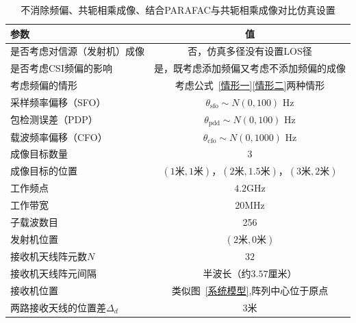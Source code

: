 \begin{table}[htb]
      \begin{center}
          \caption{不消除频偏、共轭相乘成像、结合PARAFAC与共轭相乘成像对比仿真设置}\label{对比}
          \begin{tabular}{lc} %
              \toprule
              参数 & 值 \\
              \midrule
              是否考虑对信源（发射机）成像 & 否，仿真多径没有设置LOS径\\
              是否考虑CSI频偏的影响 & 是，既考虑添加频偏又考虑不添加频偏的成像\\
              考虑频偏的情形  & 考虑公式~\eqref{情形一}\eqref{情形二}两种情形\\
              采样频率偏移（SFO）   &   $\theta_{\text{sfo}}\sim N(0,100)$ Hz\\
              包检测误差（PDP）     &   $\theta_{\text{pdd}}\sim N(0,100)$ Hz\\
              载波频率偏移（CFO）   &   $\theta_{\text{cfo}}\sim N(0,1000)$ Hz\\
              成像目标数量    & 3\\
              成像目标的位置  & $(1\text{米},1\text{米})$，$(2\text{米},1.5\text{米})$，$(3\text{米},2\text{米})$ \\
              工作频点        & $4.2$GHz\\
              工作带宽      & 20MHz \\
              子载波数目      & 256\\
              发射机位置           & $(2\text{米},0\text{米})$\\
              接收机天线阵元数$N$      & $32$\\
              接收机天线阵元间隔    & 半波长（约$3.57$厘米）\\
              接收机位置           & 类似图~\ref{系统模型},阵列中心位于原点\\
              两路接收天线的位置差$\Delta_d$ & $3$米\\
              \bottomrule
          \end{tabular}
      \end{center}
\end{table}

